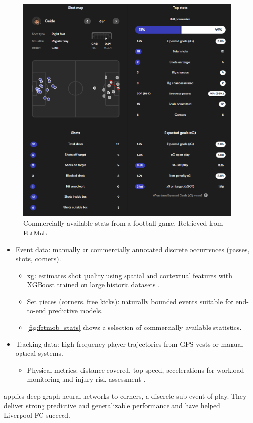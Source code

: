 \begin{figure}
    \centering
    \includegraphics[width=0.5\linewidth]{figures/fotmob_rbk.png}
    \caption{Commercially available stats from a football game. Retrieved from FotMob\cite{fotmob_game}.}
    \label{fig:fotmob_stats}
\end{figure}

\begin{itemize}
    \item Event data: manually or commercially annotated discrete occurrences (passes, shots, corners).
    \begin{itemize}
        \item \acrfull{xg}: estimates shot quality using spatial and contextual features with XGBoost trained on large historic datasets \cite{mead_xg_2023}.
        \item Set pieces (corners, free kicks): naturally bounded events suitable for end-to-end predictive models.
        \item \autoref{fig:fotmob_stats} shows a selection of commercially available statistics. 
    \end{itemize}
    \item Tracking data: high-frequency player trajectories from GPS vests or manual optical systems.
    \begin{itemize}
        \item Physical metrics: distance covered, top speed, accelerations for workload monitoring and injury risk assessment \cite{hennessy_gps_tracker_2018}.
    \end{itemize}
\end{itemize}

\textcite{wang_tactic_ai_2024} applies deep graph neural networks to corners, a discrete sub-event of play. They deliver strong predictive and generalizable performance and have helped Liverpool FC succeed. 

